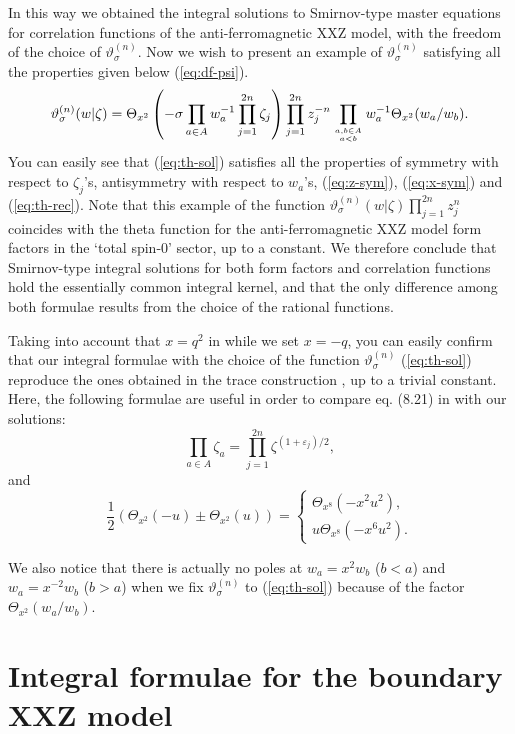\documentclass[a4paper,10pt]{article}
\begin{document}
{In this way we obtained the integral solutions to 
Smirnov-type master equations for correlation 
functions of the anti-ferromagnetic XXZ model, with the 
freedom of the choice of $\vartheta^{(n)}_\sigma$. 
Now we wish to present an example of 
$\vartheta^{(n)}_\sigma$ satisfying 
all the properties given below (\ref{eq:df-psi}). 
\begin{equation}
\vartheta^{(n)}_\sigma (w|\zeta )
=\Theta_{x^2} \left( -\sigma \prod_{a\in A} w_a^{-1} 
\prod_{j=1}^{2n}\zeta_j \right) \prod_{j=1}^{2n}z_j^{-n} 
\prod_{a,b\in A\atop a<b} w_a^{-1} 
\Theta_{x^2} (w_a /w_b ). 
\label{eq:th-sol}
\end{equation}
You can easily see that (\ref{eq:th-sol}) satisfies 
all the properties of symmetry with respect to 
$\zeta_j$'s, antisymmetry with respect to $w_a$'s, 
(\ref{eq:z-sym}), (\ref{eq:x-sym}) and (\ref{eq:th-rec}). 
Note that this example of the function 
$\vartheta^{(n)}_\sigma (w|\zeta )\prod_{j=1}^{2n}z_j^{n}$ 
coincides with the theta function for the 
anti-ferromagnetic XXZ model form factors \cite{KMQ} 
in the `total spin-$0$' sector, up to a constant. 
We therefore conclude that Smirnov-type integral solutions 
for both form factors and correlation functions hold the 
essentially common integral kernel, and that the only 
difference among both formulae results from the choice 
of the rational functions. 

Taking into account that $x=q^2$ in \cite{JMbk} while we 
set $x=-q$, you can easily confirm that our integral 
formulae with the choice of the function 
$\vartheta^{(n)}_\sigma$ (\ref{eq:th-sol}) 
reproduce the ones obtained in the trace 
construction \cite{JMbk}, up to a trivial constant. 
Here, the following formulae are useful in order to 
compare eq. (8.21) in \cite{JMbk} with our solutions: 
$$
\prod_{a\in A} \zeta_a =
\prod_{j=1}^{2n} \zeta^{(1+\varepsilon_j )/2}, 
$$
and 
$$
\frac{1}{2}\left( 
\Theta_{x^2} (-u)\pm \Theta_{x^2} (u) \right) 
=\left\{ \begin{array}{l} 
\Theta_{x^8} (-x^2 u^2 ), \\
u\Theta_{x^8} (-x^6 u^2 ). \end{array} \right. 
$$

We also notice that there is actually no poles at 
$w_a =x^2 w_b$ ($b<a$) and $w_a =x^{-2}w_b$ ($b>a$) 
when we fix $\vartheta^{(n)}_\sigma$ to (\ref{eq:th-sol}) 
because of the factor $\Theta_{x^2} (w_a /w_b )$. 

\section{Integral formulae for the boundary XXZ model}

}
\end{document}
